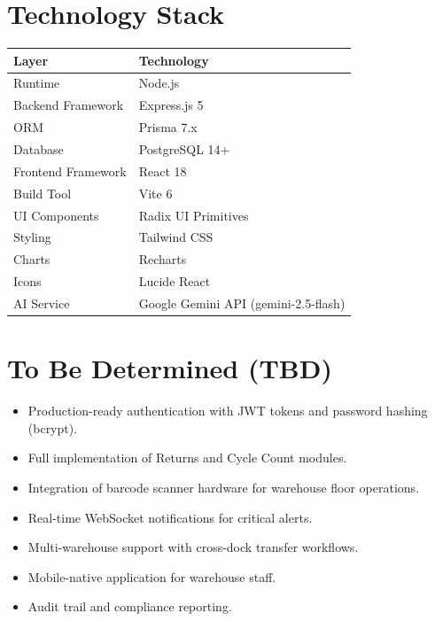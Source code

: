 \documentclass[12pt,a4paper]{report}
\begin{document}
\section{Technology Stack}
\begin{table}[H]
    \centering
    \renewcommand{\arraystretch}{1.3}
    \begin{tabularx}{\textwidth}{|l|X|}
        \hline
        \textbf{Layer} & \textbf{Technology} \\
        \hline
        Runtime & Node.js \\
        \hline
        Backend Framework & Express.js 5 \\
        \hline
        ORM & Prisma 7.x \\
        \hline
        Database & PostgreSQL 14+ \\
        \hline
        Frontend Framework & React 18 \\
        \hline
        Build Tool & Vite 6 \\
        \hline
        UI Components & Radix UI Primitives \\
        \hline
        Styling & Tailwind CSS \\
        \hline
        Charts & Recharts \\
        \hline
        Icons & Lucide React \\
        \hline
        AI Service & Google Gemini API (gemini-2.5-flash) \\
        \hline
    \end{tabularx}
\end{table}

\section{To Be Determined (TBD)}
\begin{itemize}
    \item Production-ready authentication with JWT tokens and password hashing (bcrypt).
    \item Full implementation of Returns and Cycle Count modules.
    \item Integration of barcode scanner hardware for warehouse floor operations.
    \item Real-time WebSocket notifications for critical alerts.
    \item Multi-warehouse support with cross-dock transfer workflows.
    \item Mobile-native application for warehouse staff.
    \item Audit trail and compliance reporting.
\end{itemize}
\end{document}
